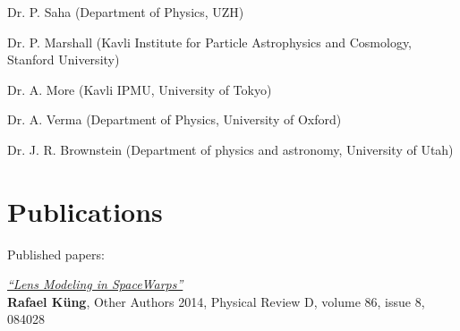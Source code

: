\documentclass[a4paper,margin,line,useAMS,usenatbib]{resume}
\begin{document}
\begin{resume}
\begin{list2}
  \item Dr. P. Saha (Department of Physics, UZH)
  \item Dr. P. Marshall (Kavli Institute for Particle Astrophysics and Cosmology, Stanford University)
  \item Dr. A. More (Kavli IPMU, University of Tokyo)
  \item Dr. A. Verma (Department of Physics, University of Oxford)
  \item Dr. J. R. Brownstein (Department of physics and astronomy, University of Utah)
\end{list2}



\section{\mysidestyle Publications}

Published papers:

\begin{list2}
  \item
    {\small \emph{\href{http://arxiv.org/abs/1234.1234}{``Lens Modeling in SpaceWarps''}}}\\
    {\bf Rafael Küng}, Other Authors
    2014,
    Physical Review D, volume 86, issue 8, 084028
\end{list2}






\end{resume}
\end{document}
